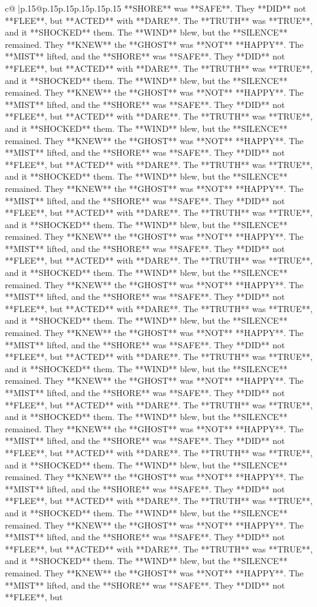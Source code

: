 \documentclass{article}
\begin{document}
{\begin{supertabular}{c@{$\;$}|p{.15\linewidth}@{}p{.15\linewidth}p{.15\linewidth}p{.15\linewidth}p{.15\linewidth}p{.15\linewidth}}
{{{**SHORE** was **SAFE**. They **DID** not **FLEE**, but **ACTED** with **DARE**. The **TRUTH** was **TRUE**, and it **SHOCKED** them. The **WIND** blew, but the **SILENCE** remained. They **KNEW** the **GHOST** was **NOT** **HAPPY**. The **MIST** lifted, and the **SHORE** was **SAFE**. They **DID** not **FLEE**, but **ACTED** with **DARE**. The **TRUTH** was **TRUE**, and it **SHOCKED** them. The **WIND** blew, but the **SILENCE** remained. They **KNEW** the **GHOST** was **NOT** **HAPPY**. The **MIST** lifted, and the **SHORE** was **SAFE**. They **DID** not **FLEE**, but **ACTED** with **DARE**. The **TRUTH** was **TRUE**, and it **SHOCKED** them. The **WIND** blew, but the **SILENCE** remained. They **KNEW** the **GHOST** was **NOT** **HAPPY**. The **MIST** lifted, and the **SHORE** was **SAFE**. They **DID** not **FLEE**, but **ACTED** with **DARE**. The **TRUTH** was **TRUE**, and it **SHOCKED** them. The **WIND** blew, but the **SILENCE** remained. They **KNEW** the **GHOST** was **NOT** **HAPPY**. The **MIST** lifted, and the **SHORE** was **SAFE**. They **DID** not **FLEE**, but **ACTED** with **DARE**. The **TRUTH** was **TRUE**, and it **SHOCKED** them. The **WIND** blew, but the **SILENCE** remained. They **KNEW** the **GHOST** was **NOT** **HAPPY**. The **MIST** lifted, and the **SHORE** was **SAFE**. They **DID** not **FLEE**, but **ACTED** with **DARE**. The **TRUTH** was **TRUE**, and it **SHOCKED** them. The **WIND** blew, but the **SILENCE** remained. They **KNEW** the **GHOST** was **NOT** **HAPPY**. The **MIST** lifted, and the **SHORE** was **SAFE**. They **DID** not **FLEE**, but **ACTED** with **DARE**. The **TRUTH** was **TRUE**, and it **SHOCKED** them. The **WIND** blew, but the **SILENCE** remained. They **KNEW** the **GHOST** was **NOT** **HAPPY**. The **MIST** lifted, and the **SHORE** was **SAFE**. They **DID** not **FLEE**, but **ACTED** with **DARE**. The **TRUTH** was **TRUE**, and it **SHOCKED** them. The **WIND** blew, but the **SILENCE** remained. They **KNEW** the **GHOST** was **NOT** **HAPPY**. The **MIST** lifted, and the **SHORE** was **SAFE**. They **DID** not **FLEE**, but **ACTED** with **DARE**. The **TRUTH** was **TRUE**, and it **SHOCKED** them. The **WIND** blew, but the **SILENCE** remained. They **KNEW** the **GHOST** was **NOT** **HAPPY**. The **MIST** lifted, and the **SHORE** was **SAFE**. They **DID** not **FLEE**, but **ACTED** with **DARE**. The **TRUTH** was **TRUE**, and it **SHOCKED** them. The **WIND** blew, but the **SILENCE** remained. They **KNEW** the **GHOST** was **NOT** **HAPPY**. The **MIST** lifted, and the **SHORE** was **SAFE**. They **DID** not **FLEE**, but **ACTED** with **DARE**. The **TRUTH** was **TRUE**, and it **SHOCKED** them. The **WIND** blew, but the **SILENCE** remained. They **KNEW** the **GHOST** was **NOT** **HAPPY**. The **MIST** lifted, and the **SHORE** was **SAFE**. They **DID** not **FLEE**, but **ACTED** with **DARE**. The **TRUTH** was **TRUE**, and it **SHOCKED** them. The **WIND** blew, but the **SILENCE** remained. They **KNEW** the **GHOST** was **NOT** **HAPPY**. The **MIST** lifted, and the **SHORE** was **SAFE**. They **DID** not **FLEE**, but }}}
\end{supertabular}}
\end{document}
